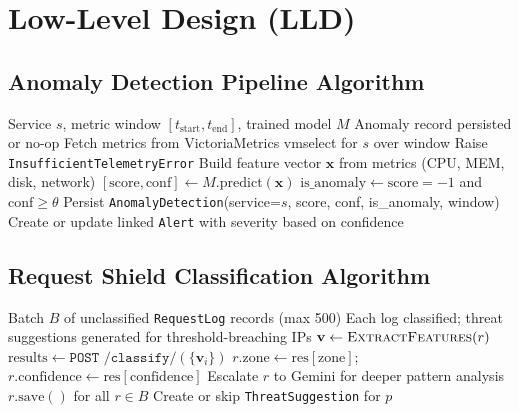 \section{Low-Level Design (LLD)}

\subsection{Anomaly Detection Pipeline Algorithm}

\begin{algorithm}[H]
\caption{Isolation Forest anomaly detection pipeline \cite{liu2008isolation}}\label{alg:anomaly}
\begin{algorithmic}[1]
\Require Service $s$, metric window $[t_{\text{start}}, t_{\text{end}}]$, trained model $M$
\Ensure Anomaly record persisted or no-op
\State Fetch metrics from VictoriaMetrics vmselect for $s$ over window
  \State Raise \texttt{InsufficientTelemetryError} 
\EndIf
\State Build feature vector $\mathbf{x}$ from metrics (CPU, MEM, disk, network)
\State $[\text{score}, \text{conf}] \leftarrow M.\text{predict}(\mathbf{x})$ 
\State $\text{is\_anomaly} \leftarrow \text{score} = -1$ and $\text{conf} \geq \theta$
\State Persist \texttt{AnomalyDetection}(service=$s$, score, conf, is\_anomaly, window)
  \State Create or update linked \texttt{Alert} with severity based on confidence
\EndIf
\end{algorithmic}
\end{algorithm}

\subsection{Request Shield Classification Algorithm}

\begin{algorithm}[H]
\caption{Request Shield batch classification pipeline \cite{breiman2001random,cicids2017}}\label{alg:shield}
\begin{algorithmic}[1]
\Require Batch $B$ of unclassified \texttt{RequestLog} records (max 500)
\Ensure Each log classified; threat suggestions generated for threshold-breaching IPs
  \State $\mathbf{v} \leftarrow \textsc{ExtractFeatures}(r)$ 
\EndFor
\State $\text{results} \leftarrow \texttt{POST /classify/}(\{\mathbf{v}_i\})$ 
  \State $r.\text{zone} \leftarrow \text{res}[\text{zone}]$; $r.\text{confidence} \leftarrow \text{res}[\text{confidence}]$
    \State Escalate $r$ to Gemini for deeper pattern analysis
  \EndIf
\EndFor
\State $r.\text{save}()$ for all $r \in B$
  \State Create or skip \texttt{ThreatSuggestion} for $p$
\EndFor
\end{algorithmic}
\end{algorithm}

